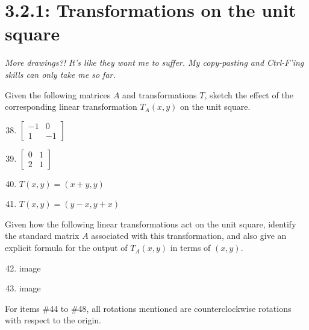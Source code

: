 \documentclass{article}
\begin{document}
\section*{3.2.1: Transformations on the unit square}
\textit{More drawings?! It's like they want me to suffer. My copy-pasting and Ctrl-F'ing skills can only take me so far. } 
\begin{center}
    \colorbox{CornflowerBlue!50}{
    \begin{minipage}[c]{0.9\textwidth}
        \centering
        Given the following matrices \(A\) and transformations \(T\), sketch the effect of the corresponding linear transformation \(T_A(x,y)\) on the unit square. 
    \end{minipage}
    }
\end{center}
\begin{enumerate}
    \setcounter{enumi}{37}
    \item \(\begin{bmatrix}
        -1&0 \\ 1&-1
    \end{bmatrix}\)
    \item \(\begin{bmatrix}
        0&1 \\ 2&1
    \end{bmatrix}\)
    \item \(T(x,y) = (x+y,y)\)
    \item \(T(x,y) = (y-x,y+x)\)
\end{enumerate}
\begin{center}
    \colorbox{CornflowerBlue!50}{
    \begin{minipage}[c]{0.9\textwidth}
        \centering
        Given how the following linear transformations act on the unit square, identify the standard matrix \(A\) associated with this transformation, and also give an explicit formula
        for the output of \(T_A(x,y)\) in terms of \((x,y)\). 
    \end{minipage}
    }
\end{center}
\begin{enumerate}
    \setcounter{enumi}{41}
    \item image
    \item image
\end{enumerate}
\begin{center}
    \colorbox{CornflowerBlue!50}{
    \begin{minipage}[c]{0.9\textwidth}
        \centering
        For items \#44 to \#48, all rotations mentioned are counterclockwise rotations with respect to the origin. 
    \end{minipage}
    }
\end{center}
\end{document}
